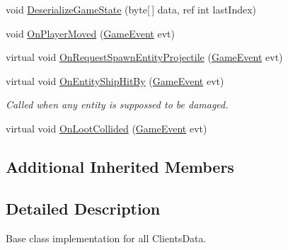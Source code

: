 \begin{DoxyCompactItemize}
void \hyperlink{class_skyrates_1_1_client_1_1_network_1_1_client_acb5b8d01c41f570e3e419eee28b39284}{Deserialize\-Game\-State} (byte\mbox{[}$\,$\mbox{]} data, ref int last\-Index)
\item 
void \hyperlink{class_skyrates_1_1_client_1_1_network_1_1_client_acd9aff235088112fb7789ba5ada41ccf}{On\-Player\-Moved} (\hyperlink{class_skyrates_1_1_client_1_1_game_1_1_event_1_1_game_event}{Game\-Event} evt)
\item 
virtual void \hyperlink{class_skyrates_1_1_client_1_1_network_1_1_client_aac2883f56c14f9682a3ef5a3fdf1eb3d}{On\-Request\-Spawn\-Entity\-Projectile} (\hyperlink{class_skyrates_1_1_client_1_1_game_1_1_event_1_1_game_event}{Game\-Event} evt)
\item 
virtual void \hyperlink{class_skyrates_1_1_client_1_1_network_1_1_client_a32fc99e5fc2746985c5866217551c12e}{On\-Entity\-Ship\-Hit\-By} (\hyperlink{class_skyrates_1_1_client_1_1_game_1_1_event_1_1_game_event}{Game\-Event} evt)
\begin{DoxyCompactList}\small\item\em Called when any entity is suppossed to be damaged. \end{DoxyCompactList}\item 
virtual void \hyperlink{class_skyrates_1_1_client_1_1_network_1_1_client_a541b4866f79747430bede856c7f91d46}{On\-Loot\-Collided} (\hyperlink{class_skyrates_1_1_client_1_1_game_1_1_event_1_1_game_event}{Game\-Event} evt)
\end{DoxyCompactItemize}
\subsection*{Additional Inherited Members}


\subsection{Detailed Description}
Base class implementation for all Clients\-Data. 



